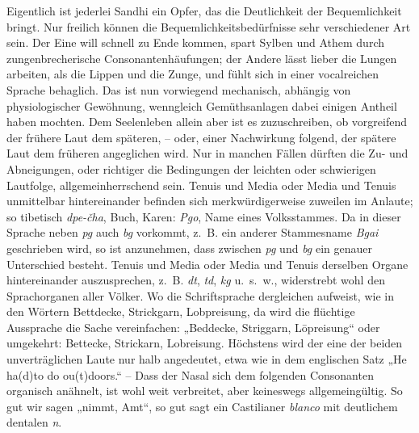 {\largerpage[-1]
Eigentlich ist jederlei Sandhi ein Opfer, das die Deutlichkeit der Bequemlichkeit bringt. Nur freilich können die Bequemlichkeitsbedürfnisse sehr verschiedener Art sein. Der Eine will schnell zu Ende kommen, spart Sylben und Athem durch zungenbrecherische Consonantenhäufungen; der Andere lässt lieber die Lungen arbeiten, als die Lippen und die Zunge, und fühlt sich in einer vocalreichen Sprache behaglich. Das ist nun vorwiegend mechanisch, abhängig von physiologischer Gewöhnung, wenngleich Gemüthsanlagen dabei einigen Antheil haben mochten. Dem Seelenleben allein aber ist es zuzuschreiben, ob vorgreifend der frühere Laut dem späteren, – oder, einer Nachwirkung folgend, der spätere Laut dem früheren angeglichen wird. Nur in manchen Fällen dürften die Zu- und Abneigungen, oder richtiger die Bedingungen der leichten oder schwierigen Lautfolge, allgemeinherrschend sein. Tenuis und Media oder Media und Tenuis unmittelbar hintereinander befinden sich merkwürdigerweise zuweilen im Anlaute; so tibetisch \textit{dpe-čha}, Buch,  Karen: \textit{Pgo}, Name eines Volksstammes. Da in dieser Sprache neben \textit{pg} auch \textit{bg} vorkommt, z.~B. ein anderer Stammesname \textit{Bgai} geschrieben wird, so ist anzunehmen, dass zwischen \textit{pg} und \textit{bg} ein genauer Unterschied besteht. Tenuis und Media oder Media und Tenuis derselben Organe hintereinander auszusprechen, z.~B. \textit{dt}, \textit{td}, \textit{kg} u.~s.~w., widerstrebt wohl den Sprachorganen aller Völker. Wo die Schriftsprache dergleichen aufweist, wie in den Wörtern Bettdecke, Strickgarn, Lobpreisung, da wird die flüchtige Aussprache die Sache vereinfachen: „Beddecke, Striggarn, Lōpreisung“ oder umgekehrt: Bettecke, Strickarn, Lobreisung. Höchstens wird der eine der beiden unverträglichen Laute nur halb angedeutet, etwa wie in dem englischen Satz „He ha(d)to do ou(t)doors.“ – Dass der Nasal sich dem folgenden Consonanten organisch anähnelt, ist wohl weit verbreitet, aber keineswegs allgemeingültig. So gut wir \label{fp.207} sagen „nimmt, Amt“, so gut sagt ein Castilianer \textit{blanco} mit deutlichem dentalen \textit{n}.

}
